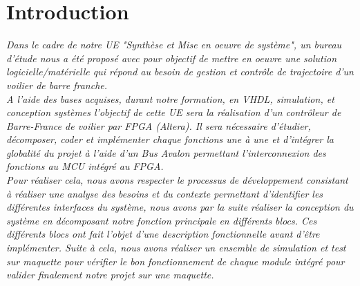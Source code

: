 \section*{Introduction}
\label{Introduction}

\textit{Dans le cadre de notre UE "Synthèse et Mise en oeuvre de système", un bureau d'étude nous a été proposé avec pour objectif de mettre en oeuvre une solution logicielle/matérielle qui répond au besoin de gestion et contrôle de trajectoire d'un voilier de barre franche.}\\

\textit{A l'aide des bases acquises, durant notre formation, en VHDL, simulation, et conception systèmes l'objectif de cette UE sera la réalisation d'un contrôleur de Barre-France de voilier par FPGA (Altera). Il sera nécessaire d'étudier, décomposer, coder et implémenter chaque fonctions une à une et d'intégrer la globalité du projet à l'aide d'un Bus Avalon permettant l'interconnexion des fonctions au MCU intégré au FPGA.}\\

\textit{Pour réaliser cela, nous avons respecter le processus de développement consistant à réaliser une analyse  des besoins et du contexte permettant d'identifier les différentes interfaces du système, nous avons par la suite réaliser la conception du système en décomposant notre fonction principale en différents blocs. Ces différents blocs ont fait l'objet d'une description fonctionnelle avant d'être implémenter. Suite à cela, nous avons réaliser un ensemble de simulation et test sur maquette pour vérifier le bon fonctionnement de chaque module intégré pour valider finalement notre projet sur une maquette.}